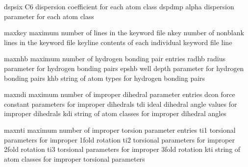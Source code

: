 \documentclass[letterpaper,11pt,english]{sphinxmanual}
\begin{document}

\begin{sphinxVerbatim}[commandchars=\\\{\}]
dspsix          C6 dispersion coefficient for each atom class
dspdmp          alpha dispersion parameter for each atom class
\end{sphinxVerbatim}


\begin{sphinxVerbatim}[commandchars=\\\{\}]
maxkey          maximum number of lines in the keyword file
nkey            number of nonblank lines in the keyword file
keyline         contents of each individual keyword file line
\end{sphinxVerbatim}


\begin{sphinxVerbatim}[commandchars=\\\{\}]
maxnhb          maximum number of hydrogen bonding pair entries
radhb           radius parameter for hydrogen bonding pairs
epshb           well depth parameter for hydrogen bonding pairs
khb             string of atom types for hydrogen bonding pairs
\end{sphinxVerbatim}


\begin{sphinxVerbatim}[commandchars=\\\{\}]
maxndi          maximum number of improper dihedral parameter entries
dcon            force constant parameters for improper dihedrals
tdi             ideal dihedral angle values for improper dihedrals
kdi             string of atom classes for improper dihedral angles
\end{sphinxVerbatim}


\begin{sphinxVerbatim}[commandchars=\\\{\}]
maxnti          maximum number of improper torsion parameter entries
ti1             torsional parameters for improper 1\PYGZhy{}fold rotation
ti2             torsional parameters for improper 2\PYGZhy{}fold rotation
ti3             torsional parameters for improper 3\PYGZhy{}fold rotation
kti             string of atom classes for improper torsional parameters
\end{sphinxVerbatim}
\end{document}
